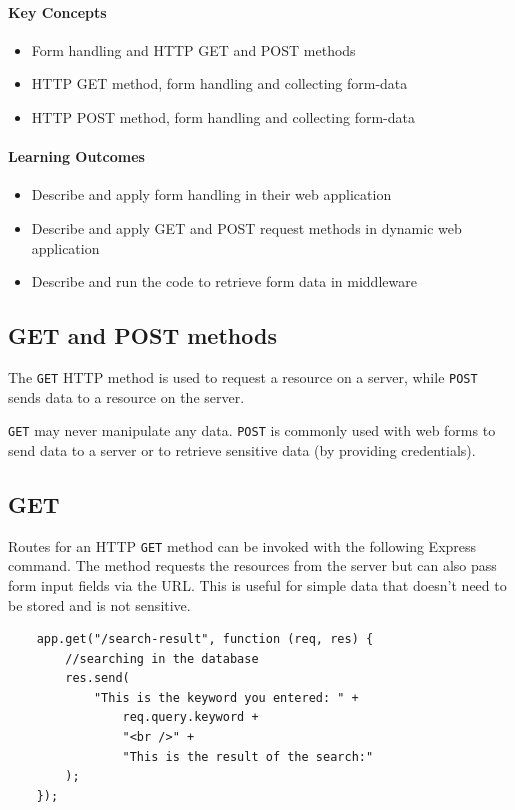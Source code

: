 \begin{mdframed}

\paragraph{Key Concepts}
\begin{itemize}[label={\checkmark}]
    \item Form handling and HTTP GET and POST methods
    \item HTTP GET method, form handling and collecting form-data
    \item HTTP POST method, form handling and collecting form-data
\end{itemize}

\paragraph{Learning Outcomes}
\begin{itemize}[label={\checkmark}]
\item Describe and apply form handling in their web application
\item Describe and apply GET and POST request methods in dynamic web application
\item Describe and run the code to retrieve form data in middleware
\end{itemize}
\end{mdframed}

\subsection{GET and POST methods}
The \texttt{GET} HTTP method is used to request a resource on a server, while \texttt{POST} sends data to a resource on the server.

\texttt{GET} may never manipulate any data. \texttt{POST} is commonly used with web forms to send data to a server or to retrieve sensitive data (by providing credentials).

\subsection{GET}

Routes for an HTTP \texttt{GET} method can be invoked with the following Express command. The method requests the resources from the server but can also pass form input fields via the URL. This is useful for simple data that doesn't need to be stored and is not sensitive.
\begin{verbatim}
	app.get("/search-result", function (req, res) {
		//searching in the database
		res.send(
			"This is the keyword you entered: " +
				req.query.keyword +
				"<br />" +
				"This is the result of the search:"
		);
	});
   \end{verbatim}

